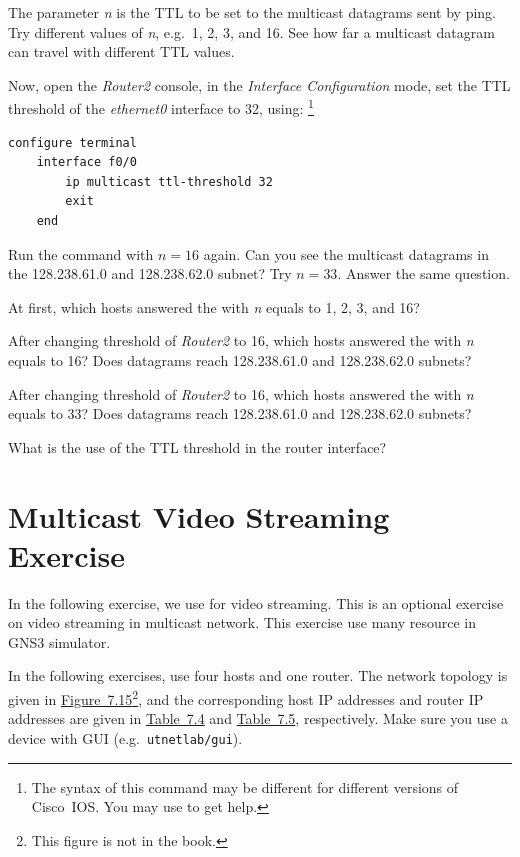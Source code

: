 \documentclass{../UTNetLab}
\begin{document}
The parameter \textit{n} is the TTL to be set to the multicast datagrams sent by ping.
Try different values of \textit{n}, e.g.\ 1, 2, 3, and 16.
See how far a multicast datagram can travel with different TTL values.

Now, open the \textit{Router2} console, in the \textit{Interface Configuration} mode, set the TTL threshold of the \textit{ethernet0} interface to 32, using:
\footnote{The syntax of this command may be different for different versions of Cisco~IOS.
    You may use  to get help.}

\begin{lstlisting}[language={cisco}]    
configure terminal
    interface f0/0
        ip multicast ttl-threshold 32
        exit
    end
\end{lstlisting}

Run the  command with $n = 16$ again.
Can you see the multicast datagrams in the 128.238.61.0 and 128.238.62.0 subnet?
Try $n = 33$.
Answer the same question.

\begin{report}
    \item At first, which hosts answered the  with \textit{n} equals to 1, 2, 3, and 16?
    \item After changing threshold of \textit{Router2} to 16, which hosts answered the  with \textit{n} equals to 16?
    Does datagrams reach 128.238.61.0 and 128.238.62.0 subnets?
    \item After changing threshold of \textit{Router2} to 16, which hosts answered the  with \textit{n} equals to 33?
    Does datagrams reach 128.238.61.0 and 128.238.62.0 subnets?

    \item What is the use of the TTL threshold in the router interface?
\end{report}

\part{Multicast Video Streaming Exercise}\label{sec:multicast-streaming}
In the following exercise, we use  for video streaming.
This is an optional exercise on video streaming in multicast network.
This exercise use many resource in GNS3 simulator.

In the following exercises, use four hosts and one router. The network topology is given in \hyperref[fig:7.15]{Figure~7.15}\footnote{This figure is not in the book.}, and the corresponding host IP addresses and router IP addresses are given in \hyperref[tab:7.4]{Table~7.4} and \hyperref[tab:7.5]{Table~7.5}, respectively.
Make sure you use a device with GUI (e.g.\ \texttt{utnetlab/gui}).
\end{document}
